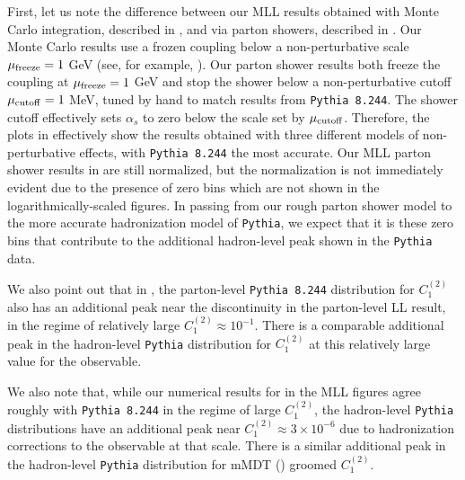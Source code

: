 First, let us note the difference between our MLL results obtained with Monte Carlo integration, described in , and via parton showers, described in .
%
Our Monte Carlo results use a frozen coupling below a non-perturbative scale \(\mu_{\rm freeze} = 1\) GeV (see, for example, ). Our parton shower results both freeze the coupling at \(\mu_{\rm freeze} = 1\) GeV and stop the shower below a non-perturbative cutoff \(\mu_{\rm cutoff} = 1\) MeV, tuned by hand to match results from \texttt{Pythia 8.244}.
%
The shower cutoff effectively sets \(\alpha_s\) to zero below the scale set by \(\mu_{\rm cutoff}\).
%
Therefore, the plots in  effectively show the results obtained with three different models of non-perturbative effects, with \texttt{Pythia 8.244} the most accurate.
%
Our MLL parton shower results in  are still normalized, but the normalization is not immediately evident due to the presence of zero bins which are not shown in the logarithmically-scaled figures.
%
In passing from our rough parton shower model to the more accurate hadronization model of \texttt{Pythia}, we expect that it is these zero bins that contribute to the additional hadron-level peak shown in the \texttt{Pythia} data.

We also point out that in , the parton-level \texttt{Pythia 8.244} distribution for \(C_1^{(2)}\) also has an additional peak near the discontinuity in the parton-level LL result, in the regime of relatively large \(C_1^{(2)} \approx 10^{-1}\).
%
There is a comparable additional peak in the hadron-level \texttt{Pythia} distribution for \(C_1^{(2)}\) at this relatively large value for the observable.

We also note that, while our numerical results for  in the MLL figures agree roughly with \texttt{Pythia 8.244} in the regime of large \(C_1^{(2)}\), the hadron-level \texttt{Pythia} distributions have an additional peak near \(C_1^{(2)} \approx 3\times 10^{-6}\) due to hadronization corrections to the observable at that scale.
%
There is a similar additional peak in the hadron-level \texttt{Pythia} distribution for mMDT () groomed \(C_1^{(2)}\).




